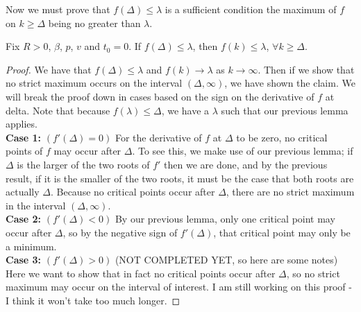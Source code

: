 Now we must prove that $f(\Delta) \leq \lambda$ is a sufficient condition the maximum of $f$ on $k\geq \Delta$ being no greater than $\lambda$.

\begin{lemma}
Fix $R > 0$, $\beta$, $p$, $v$ and $t_0 = 0$. If $f(\Delta) \leq \lambda$, then $f(k) \leq \lambda$, $\forall k \geq \Delta$. 
\end{lemma}

\begin{proof}
We have that $f(\Delta) \leq \lambda$ and $f(k) \rightarrow \lambda$ as $k \rightarrow \infty$. Then if we show that no strict maximum occurs on the interval $(\Delta, \infty)$, we have shown the claim. We will break the proof down in cases based on the sign on the derivative of $f$ at delta. Note that because $f(\lambda) \leq \Delta$, we have a $\lambda$ such that our previous lemma applies. \\

\textbf{Case 1:} $(f'(\Delta) = 0)$ For the derivative of $f$ at $\Delta$ to be zero, no critical points of $f$ may occur after $\Delta$. To see this, we make use of our previous lemma; if $\Delta$ is the larger of the two roots of $f'$ then we are done, and by the previous result, if it is the smaller of the two roots, it must be the case that both roots are actually $\Delta$. Because no critical points occur after $\Delta$, there are no strict maximum in the interval $(\Delta, \infty)$. \\

\textbf{Case 2:} $(f'(\Delta) < 0)$ By our previous lemma, only one critical point may occur after $\Delta$, so by the negative sign of $f'(\Delta)$, that critical point may only be a minimum. \\

\textbf{Case 3:} $(f'(\Delta) > 0)$ (NOT COMPLETED YET, so here are some notes) Here we want to show that in fact no critical points occur after $\Delta$, so no strict maximum may occur on the interval of interest. I am still working on this proof - I think it won't take too much longer. 
\end{proof}
